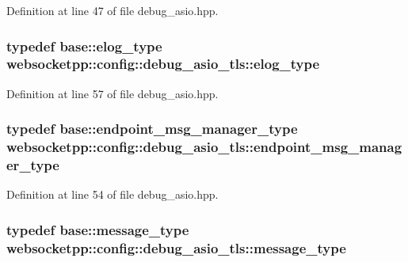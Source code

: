 Definition at line 47 of file debug\+\_\+asio.\+hpp.

\hypertarget{structwebsocketpp_1_1config_1_1debug__asio__tls_a1f2ef75a6538ba22a7fbfa0749d3ad7e}{}
\subsubsection[{elog\+\_\+type}]{\setlength{\rightskip}{0pt plus 5cm}typedef {\bf base\+::elog\+\_\+type} {\bf websocketpp\+::config\+::debug\+\_\+asio\+\_\+tls\+::elog\+\_\+type}}\label{structwebsocketpp_1_1config_1_1debug__asio__tls_a1f2ef75a6538ba22a7fbfa0749d3ad7e}


Definition at line 57 of file debug\+\_\+asio.\+hpp.

\hypertarget{structwebsocketpp_1_1config_1_1debug__asio__tls_a2457bf3a910a01c162fffe78bf120cc7}{}
\subsubsection[{endpoint\+\_\+msg\+\_\+manager\+\_\+type}]{\setlength{\rightskip}{0pt plus 5cm}typedef {\bf base\+::endpoint\+\_\+msg\+\_\+manager\+\_\+type} {\bf websocketpp\+::config\+::debug\+\_\+asio\+\_\+tls\+::endpoint\+\_\+msg\+\_\+manager\+\_\+type}}\label{structwebsocketpp_1_1config_1_1debug__asio__tls_a2457bf3a910a01c162fffe78bf120cc7}


Definition at line 54 of file debug\+\_\+asio.\+hpp.

\hypertarget{structwebsocketpp_1_1config_1_1debug__asio__tls_a9cb98a6f60894bc59c2775a982121bfe}{}
\subsubsection[{message\+\_\+type}]{\setlength{\rightskip}{0pt plus 5cm}typedef {\bf base\+::message\+\_\+type} {\bf websocketpp\+::config\+::debug\+\_\+asio\+\_\+tls\+::message\+\_\+type}}\label{structwebsocketpp_1_1config_1_1debug__asio__tls_a9cb98a6f60894bc59c2775a982121bfe}


